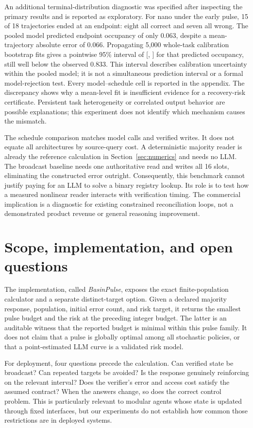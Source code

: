 \documentclass[11pt]{article}
\theoremstyle{remark}\newtheorem{remark}[theorem]{Remark}
\begin{document}
An additional terminal-distribution diagnostic was specified after inspecting the primary results and is reported as exploratory. For nano under the early pulse, 15 of 18 trajectories ended at an endpoint: eight all correct and seven all wrong. The pooled model predicted endpoint occupancy of only 0.063, despite a mean-trajectory absolute error of 0.066. Propagating 5,000 whole-task calibration bootstrap fits gives a pointwise 95\% interval of [\TailLower, \TailUpper] for that predicted occupancy, still well below the observed 0.833. This interval describes calibration uncertainty within the pooled model; it is not a simultaneous prediction interval or a formal model-rejection test. Every model--schedule cell is reported in the appendix. The discrepancy shows why a mean-level fit is insufficient evidence for a recovery-risk certificate. Persistent task heterogeneity or correlated output behavior are possible explanations; this experiment does not identify which mechanism causes the mismatch.

The schedule comparison matches model calls and verified writes. It does not equate all architectures by source-query cost. A deterministic majority reader is already the reference calculation in Section~\ref{sec:numerics} and needs no LLM. The broadcast baseline needs one authoritative read and writes all 16 slots, eliminating the constructed error outright. Consequently, this benchmark cannot justify paying for an LLM to solve a binary registry lookup. Its role is to test how a measured nonlinear reader interacts with verification timing. The commercial implication is a diagnostic for existing constrained reconciliation loops, not a demonstrated product revenue or general reasoning improvement.

\section{Scope, implementation, and open questions}
The implementation, called \emph{BasinPulse}, exposes the exact finite-population calculator and a separate distinct-target option. Given a declared majority response, population, initial error count, and risk target, it returns the smallest pulse budget and the risk at the preceding integer budget. The latter is an auditable witness that the reported budget is minimal within this pulse family. It does not claim that a pulse is globally optimal among all stochastic policies, or that a point-estimated LLM curve is a validated risk model.

For deployment, four questions precede the calculation. Can verified state be broadcast? Can repeated targets be avoided? Is the response genuinely reinforcing on the relevant interval? Does the verifier's error and access cost satisfy the assumed contract? When the answers change, so does the correct control problem. This is particularly relevant to modular agents whose state is updated through fixed interfaces, but our experiments do not establish how common those restrictions are in deployed systems.
\end{document}
